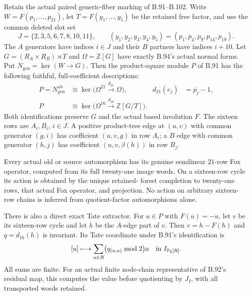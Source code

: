 \label{stmt:B104}
Retain the actual paired generic-fiber marking of B.91--B.102.
Write $W=F(p_1,\ldots,p_{21})$, let $T=F(y_1,\ldots,y_5)$ be
the retained free factor, and use the common deleted slot set
\[
 J=\{2,3,5,6,7,8,10,11\},\qquad
 (y_1,y_2,y_3,y_4,y_5)=(p_1,p_4,p_9,p_{14},p_{19}).
\]
The $A$ generators have indices $i\in J$ and their $B$ partners
have indices $i+10$. Let $G=(R_A\times R_B)\rtimes T$ and
$\Omega=\mathbb Z[G]$ have exactly B.94's actual normal forms.
Put $N_{\mathrm{gen}}=\ker(W\to G)$. Then the product-square module
$P$ of B.91 has the following faithful, full-coefficient descriptions:
\begin{equation}\label{eq:B104-two-models}
 \begin{aligned}
 P=N_{\mathrm{gen}}^{\mathrm{ab}}
   &\cong\ker\bigl(\Omega^{21}\xrightarrow{d_{21}}\Omega\bigr),
       &d_{21}(e_j)&=\overline p_j-1,\\
 P&\cong\ker\bigl(\Omega^{16}\xrightarrow{d_{16}}\mathbb Z[G/T]\bigr).
 \end{aligned}
\end{equation}
Both identifications preserve $G$ and the actual based involution $F$.
The sixteen rows are $A_i,B_i$, $i\in J$. A positive product-tree edge
at $(u,v)$ with common generator $(g,i)$ has coefficient $(u,v,g)$
in row $A_i$; a $B$ edge with common generator $(h,j)$ has coefficient
$(u,v,\beta(h))$ in row $B_j$.

Every actual old or source automorphism has its genuine semilinear
$21$-row Fox operator, computed from its full twenty-one image words.
On a sixteen-row cycle its action is obtained by the unique retained-
forest completion to twenty-one rows, that actual Fox operator, and
projection. No action on arbitrary sixteen-row chains is inferred
from quotient-factor automorphisms alone.

There is also a direct exact Tate extractor. For $u\in P$ with
$F(u)=-u$, let $v$ be its sixteen-row cycle and let $h$ be the
$A$-edge part of $v$. Then $v=h-F(h)$ and $q=d_{16}(h)$ is invariant.
Its Tate coordinate under B.91's identification is
\begin{equation}\label{eq:B104-extractor}
 [u]\longmapsto
 \sum_{a\in R}\bigl(q_{(a,a)}\bmod2\bigr)a
          \quad\hbox{in }I_{\mathbb F_2[R]}.
\end{equation}
All sums are finite. For an actual finite node-chain representative
of B.92's residual map, this computes the value before quotienting
by $J_I$, with all transported words retained.

